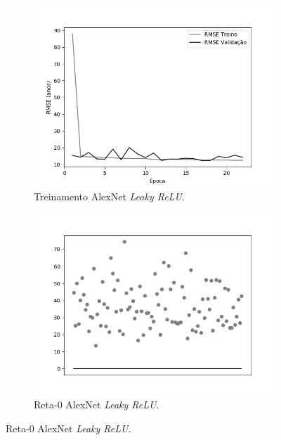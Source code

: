 \begin{figure}[hb!]
\begin{subfigure}[hb]{0.5\linewidth}
		\end{subfigure}\\
		\begin{subfigure}[hb]{0.5\linewidth}
			\caption{Treinamento AlexNet \emph{Leaky ReLU}.}
			\label{fig:histalexlrelunorm}
			\centering
			\includegraphics[width=\linewidth]{img/graficos/history/alexnet/fig-history-image-treat-3-alexnet-lrelu-rmse.png}
		\end{subfigure}
		\begin{subfigure}[hb]{0.5\linewidth}
			\caption{Reta-0 AlexNet \emph{Leaky ReLU}.}
			\label{fig:redeneuralbiologica}
			\includegraphics[width=\linewidth]{img/graficos/reta0/alexnet/fig-reta-0-image-treat-3-alexnet-lrelu.png}
		\end{subfigure}%
	\end{figure}


